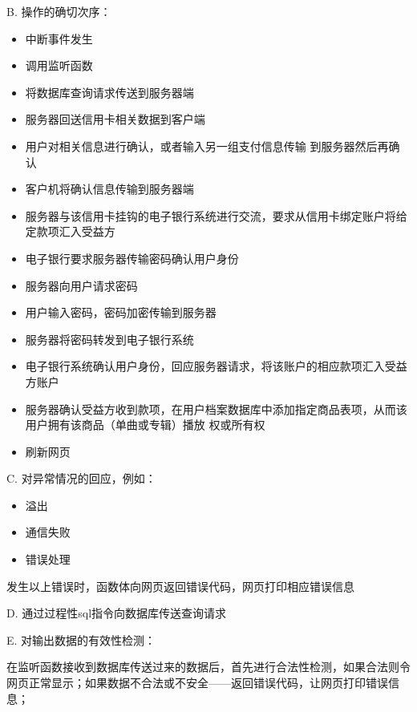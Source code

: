 			B. 操作的确切次序：
			\begin{adjustwidth}{2cm}{1cm}\qquad
				\begin{itemize}
				  \item 中断事件发生
				  \item 调用监听函数
				  \item 将数据库查询请求传送到服务器端
				  \item 服务器回送信用卡相关数据到客户端
				  \item 用户对相关信息进行确认，或者输入另一组支付信息传输
				  到服务器然后再确认
				  \item 客户机将确认信息传输到服务器端
				  \item 服务器与该信用卡挂钩的电子银行系统进行交流，要求从信用卡绑定账户将给定款项汇入受益方
				  \item 电子银行要求服务器传输密码确认用户身份
				  \item 服务器向用户请求密码
				  \item 用户输入密码，密码加密传输到服务器
				  \item 服务器将密码转发到电子银行系统
				  \item 电子银行系统确认用户身份，回应服务器请求，将该账户的相应款项汇入受益方账户
				  \item 服务器确认受益方收到款项，在用户档案数据库中添加指定商品表项，从而该用户拥有该商品（单曲或专辑）播放
				  权或所有权
				  \item 刷新网页
				\end{itemize}		
			\end{adjustwidth}
			 
			
			C. 对异常情况的回应，例如：
			\begin{adjustwidth}{2cm}{1cm}\qquad
				\begin{itemize}
					\item 溢出
					\item 通信失败
					\item 错误处理
				\end{itemize}		
			\end{adjustwidth}
			
				发生以上错误时，函数体向网页返回错误代码，网页打印相应错误信息
			
	  D. 通过过程性sql指令向数据库传送查询请求
					
			E. 对输出数据的有效性检测：
			
			在监听函数接收到数据库传送过来的数据后，首先进行合法性检测，如果合法则令网页正常显示；如果数据不合法或不安全——返回错误代码，让网页打印错误信息；
			
